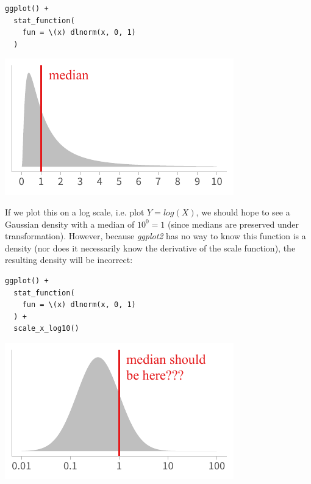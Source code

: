 \documentclass[journal]{vgtc}                     %
\begin{document}
\noindent
\begin{minipage}{.5\columnwidth}
\small
\begin{verbatim}
ggplot() +
  stat_function(
    fun = \(x) dlnorm(x, 0, 1)
  )
\end{verbatim}
\end{minipage}%
  \begin{minipage}{.4\columnwidth}
    \centering
    \includegraphics[width=1.2\columnwidth]{figs/3-jacobian-lognorm.pdf}
  \end{minipage}
\hfill\break


If we plot this on a log scale, i.e. plot $Y = log(X)$, we should hope to see a Gaussian density with a median of $10^0 = 1$ (since medians are preserved under transformation). However, because \textit{ggplot2} has no way to know this function is a density (nor does it necessarily know the derivative of the scale function), the resulting density will be incorrect:

\noindent
\begin{minipage}{.5\columnwidth}
\small
\begin{verbatim}
ggplot() +
  stat_function(
    fun = \(x) dlnorm(x, 0, 1)
  ) +
  scale_x_log10()
\end{verbatim}
\end{minipage}%
  \begin{minipage}{.4\columnwidth}
    \centering
    \includegraphics[width=1.2\columnwidth]{figs/3-jacobian-incorrect.pdf}
  \end{minipage}
\hfill\break
\end{document}
